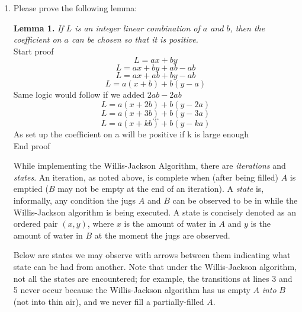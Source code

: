 \documentclass[10pt, AMS Euler]{article}
\begin{document}
	
	\begin{enumerate}

            \newpage
		\item Please prove the following lemma:
		
		{\bf Lemma 1.} \emph{If $L$ is an integer linear combination of $a$ and $b$, then the coefficient on $a$ can be chosen so that it is positive.}\\

            Start proof \\
            
                $$ L = ax + by $$
                $$ L = ax + by +ab-ab $$
                $$ L = ax+ab + by-ab $$
                $$ L = a(x+b) + b(y-a) $$
                Same logic would follow if we added $2ab-2ab$ \\
                $$ L = a(x+2b) + b(y-2a) $$
                $$ L = a(x+3b) + b(y-3a) $$
                $$...$$
                $$ L = a(x+kb) + b(y-ka) $$
                As set up the coefficient on a will be positive if k is large enough \\

            End proof \\

            \newpage
		
		While implementing the Willis-Jackson Algorithm, there are \emph{iterations} and \emph{states}.  An iteration, as noted above, is complete when (after being filled) $A$ is emptied ($B$ may not be empty at the end of an iteration).  
		A \emph{state} is, informally, any condition the jugs $A$ and $B$ can be observed to be in while the Willis-Jackson algorithm is being executed.  
		A state is concisely denoted as an ordered pair $(x,y)$, where $x$ is the amount of water in $A$ and $y$ is the amount of water in $B$ at the moment the jugs are observed.
		
		Below are states we may observe with arrows between them indicating what state can be had from another. Note that under the Willis-Jackson algorithm, not all the states are encountered; for example, the transitions at lines 3 and 5 never occur because the Willis-Jackson algorithm has us empty $A$ \emph{into} $B$ (not into thin air), and we never fill a partially-filled $A$.  
		

\end{enumerate}
\end{document}
